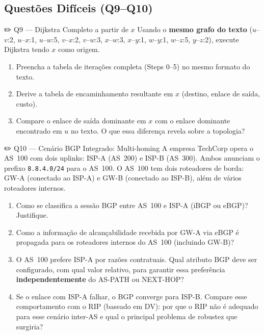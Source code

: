 \documentclass[11pt,a4paper]{article}
\begin{document}
\subsection*{Questões Difíceis (Q9--Q10)}

\begin{questao}{✏️ Q9 --- Dijkstra Completo a partir de $x$}
Usando o \textbf{mesmo grafo do texto} ($u$--$v$:2, $u$--$x$:1, $u$--$w$:5, $v$--$x$:2, $v$--$w$:3, $x$--$w$:3, $x$--$y$:1, $w$--$y$:1, $w$--$z$:5, $y$--$z$:2), execute Dijkstra tendo \textbf{$x$} como origem.
\begin{enumerate}[label=(\alph*)]
    \item Preencha a tabela de iterações completa (Steps 0--5) no mesmo formato do texto.
    \item Derive a tabela de encaminhamento resultante em $x$ (destino, enlace de saída, custo).
    \item Compare o enlace de saída dominante em $x$ com o enlace dominante encontrado em $u$ no texto. O que essa diferença revela sobre a topologia?
\end{enumerate}
\end{questao}

\begin{questao}{✏️ Q10 --- Cenário BGP Integrado: Multi-homing}
A empresa TechCorp opera o AS~100 com dois uplinks: ISP-A (AS~200) e ISP-B (AS~300). Ambos anunciam o prefixo \texttt{8.8.4.0/24} para o AS~100. O AS~100 tem dois roteadores de borda: GW-A (conectado ao ISP-A) e GW-B (conectado ao ISP-B), além de vários roteadores internos.
\begin{enumerate}[label=(\alph*)]
    \item Como se classifica a sessão BGP entre AS~100 e ISP-A (iBGP ou eBGP)? Justifique.
    \item Como a informação de alcançabilidade recebida por GW-A via eBGP é propagada para os roteadores internos do AS~100 (incluindo GW-B)?
    \item O AS~100 prefere ISP-A por razões contratuais. Qual atributo BGP deve ser configurado, com qual valor relativo, para garantir essa preferência \textbf{independentemente} do AS-PATH ou NEXT-HOP?
    \item Se o enlace com ISP-A falhar, o BGP converge para ISP-B. Compare esse comportamento com o RIP (baseado em DV): por que o RIP não é adequado para esse cenário inter-AS e qual o principal problema de robustez que surgiria?
\end{enumerate}
\end{questao}
\end{document}
